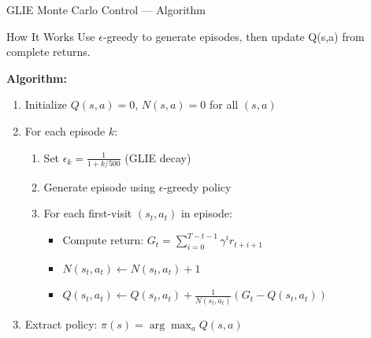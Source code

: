 \documentclass[aspectratio=169]{beamer}
\begin{document}
\begin{frame}{GLIE Monte Carlo Control — Algorithm}
    \begin{block}{How It Works}
        Use $\epsilon$-greedy to generate episodes, then update Q(s,a) from complete returns.
    \end{block}

    \vspace{0.2cm}

    \textbf{Algorithm:}
    \begin{enumerate}
        \item Initialize $Q(s,a) = 0$, $N(s,a) = 0$ for all $(s,a)$
        \item For each episode $k$:
        \begin{enumerate}
            \item Set $\epsilon_k = \frac{1}{1 + k/500}$ (GLIE decay)
            \item Generate episode using $\epsilon$-greedy policy
            \item For each first-visit $(s_t, a_t)$ in episode:
                \begin{itemize}
                    \item Compute return: $G_t = \sum_{i=0}^{T-t-1} \gamma^i r_{t+i+1}$
                    \item $N(s_t, a_t) \leftarrow N(s_t, a_t) + 1$
                    \item $Q(s_t, a_t) \leftarrow Q(s_t, a_t) + \frac{1}{N(s_t,a_t)}(G_t - Q(s_t, a_t))$
                \end{itemize}
        \end{enumerate}
        \item Extract policy: $\pi(s) = \arg\max_a Q(s,a)$
    \end{enumerate}
\end{frame}
\end{document}
